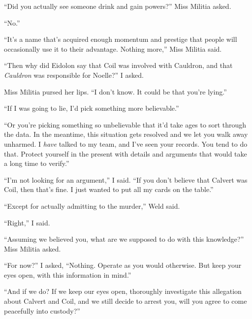 ``Did you actually see someone drink and gain powers?''  Miss Militia asked.



``No.''



``It's a name that's acquired enough momentum and prestige that people will occasionally use it to their advantage.  Nothing more,'' Miss Militia said.



``Then why did Eidolon say that Coil was involved with Cauldron, and that \emph{Cauldron} was responsible for Noelle?''  I asked.



Miss Militia pursed her lips.  ``I don't know.  It could be that you're lying.''



``If I was going to lie, I'd pick something more believable.''



``Or you're picking something so unbelievable that it'd take ages to sort through the data.  In the meantime, this situation gets resolved and we let you walk away unharmed.  I \emph{have} talked to my team, and I've seen your records.  You tend to do that.  Protect yourself in the present with details and arguments that would take a long time to verify.''



``I'm not looking for an argument,'' I said.  ``If you don't believe that Calvert was Coil, then that's fine.  I just wanted to put all my cards on the table.''



``Except for actually admitting to the murder,'' Weld said.



``Right,'' I said.



``Assuming we believed you, what are we supposed to do with this knowledge?''  Miss Militia asked.



``For now?'' I asked, ``Nothing.  Operate as you would otherwise.  But keep your eyes open, with this information in mind.''



``And if we do?  If we keep our eyes open, thoroughly investigate this allegation about Calvert and Coil, and we still decide to arrest you, will you agree to come peacefully into custody?''



